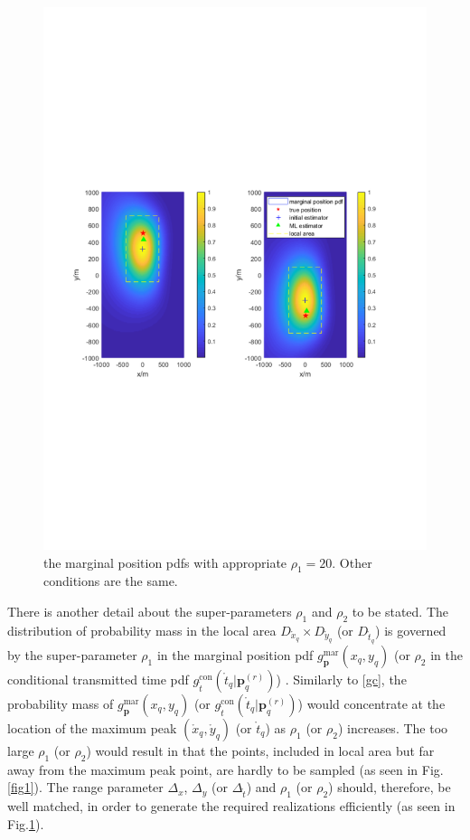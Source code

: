 \documentclass[review]{elsarticle}
\begin{document}
\begin{figure}[!t]
    \centerline{\includegraphics[width=1\textwidth]{pdfFigures/appropriate_rho1=20.pdf}}
    \centering
	\caption{the marginal position pdfs with appropriate $\rho_1=20$. Other conditions are the same.}\label{fig2}
\end{figure}

There is another detail about the super-parameters $\rho_1$ and $\rho_2$ to be stated. The distribution of probability mass in the local area $D_{\mathring{x}_q}\times D_{\mathring{y}_q}$ (or $D_{\mathring{t}_q}$) is governed by the super-parameter $\rho_1$ in the marginal position pdf $g_{\boldsymbol{p}}^{\text{mar}}(x_q,y_q)$ (or $\rho_2$ in the conditional transmitted time pdf $g_{\mathring{t}}^{\text{con}}(\mathring{t}_q\vert \boldsymbol{p}_q^{(r)})$) . Similarly to \eqref{gc}, the probability mass of $g_{\boldsymbol{p}}^{\text{mar}}(x_q,y_q)$ (or $g_{\mathring{t}}^{\text{con}}(\mathring{t}_q\vert \boldsymbol{p}_q^{(r)})$) would concentrate at the location of the maximum peak $(\mathring{x}_q,\mathring{y}_q)$ (or $\mathring{t}_q$) as $\rho_1$ (or $\rho_2$) increases. The too large $\rho_1$ (or $\rho_2$) would result in that the points, included in local area but far away from the maximum peak point, are hardly to be sampled (as seen in Fig.\ref{fig1}). The range parameter $\Delta_x$, $\Delta_y$ (or $\Delta_{\mathring{t}}$) and $\rho_1$ (or $\rho_2$) should, therefore, be well matched, in order to generate the required realizations efficiently (as seen in Fig.\ref{fig2}). 
\end{document}
